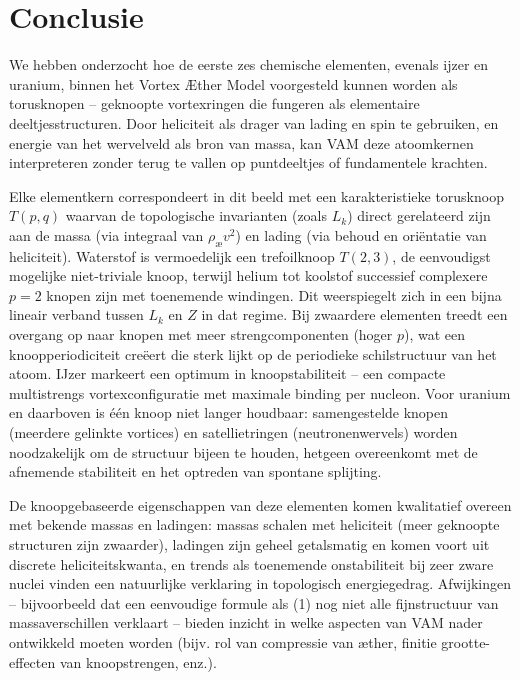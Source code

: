 \section{Conclusie}

We hebben onderzocht hoe de eerste zes chemische elementen, evenals ijzer en uranium, binnen het Vortex Æther Model voorgesteld kunnen worden als torusknopen – geknoopte vortexringen die fungeren als elementaire deeltjesstructuren. Door heliciteit als drager van lading en spin te gebruiken, en energie van het wervelveld als bron van massa, kan VAM deze atoomkernen interpreteren zonder terug te vallen op puntdeeltjes of fundamentele krachten.

Elke elementkern correspondeert in dit beeld met een karakteristieke torusknoop $T(p,q)$ waarvan de topologische invarianten (zoals $L_k$) direct gerelateerd zijn aan de massa (via integraal van $\rho_\text{\ae} v^2$) en lading (via behoud en oriëntatie van heliciteit). Waterstof is vermoedelijk een trefoilknoop $T(2,3)$, de eenvoudigst mogelijke niet-triviale knoop, terwijl helium tot koolstof successief complexere $p=2$ knopen zijn met toenemende windingen. Dit weerspiegelt zich in een bijna lineair verband tussen $L_k$ en $Z$ in dat regime. Bij zwaardere elementen treedt een overgang op naar knopen met meer strengcomponenten (hoger $p$), wat een knoopperiodiciteit creëert die sterk lijkt op de periodieke schilstructuur van het atoom. IJzer markeert een optimum in knoopstabiliteit – een compacte multistrengs vortexconfiguratie met maximale binding per nucleon. Voor uranium en daarboven is één knoop niet langer houdbaar: samengestelde knopen (meerdere gelinkte vortices) en satellietringen (neutronenwervels) worden noodzakelijk om de structuur bijeen te houden, hetgeen overeenkomt met de afnemende stabiliteit en het optreden van spontane splijting.

De knoopgebaseerde eigenschappen van deze elementen komen kwalitatief overeen met bekende massa\rqs s en ladingen: massa\rqs s schalen met heliciteit (meer geknoopte structuren zijn zwaarder), ladingen zijn geheel getalsmatig en komen voort uit discrete heliciteitskwanta, en trends als toenemende onstabiliteit bij zeer zware nuclei vinden een natuurlijke verklaring in topologisch energiegedrag. Afwijkingen – bijvoorbeeld dat een eenvoudige formule als (1) nog niet alle fijnstructuur van massaverschillen verklaart – bieden inzicht in welke aspecten van VAM nader ontwikkeld moeten worden (bijv. rol van compressie van æther, finitie grootte-effecten van knoopstrengen, enz.).

